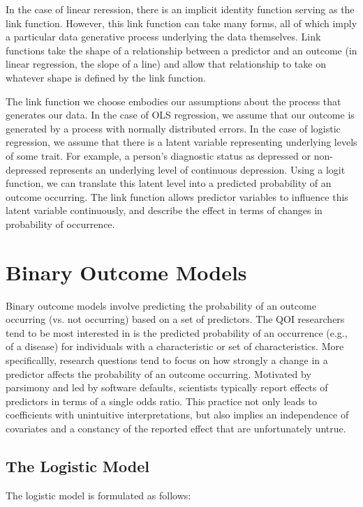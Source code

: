 \documentclass[jou, apacite]{apa6}
\begin{document}
In the case of linear reression, there is an implicit identity function serving as the link function.
However, this link function can take many forms, all of which imply a particular data generative process underlying the data themselves.
Link functions take the shape of a relationship between a predictor and an outcome (in linear regression, the slope of a line) and allow that relationship to take on whatever shape is defined by the link function.

The link function we choose embodies our assumptions about the process that generates our data.
In the case of OLS regression, we assume that our outcome is generated by a process with normally distributed errors.
In the case of logistic regression, we assume that there is a latent variable representing underlying levels of some trait. 
For example, a person's diagnostic status as depressed or non-depressed represents an underlying level of continuous depression. 
Using a logit function, we can translate this latent level into a predicted probability of an outcome occurring.
The link function allows predictor variables to influence this latent variable continuously, and describe the effect in terms of changes in probability of occurrence.
\section{Binary Outcome Models}

Binary outcome models involve predicting the probability of an outcome occurring (vs. not occurring) based on a set of predictors. 
The QOI researchers tend to be most interested in is the predicted probability of an occurrence (e.g., of a disease) for individuals with a characteristic or set of characteristics.
More specificallly, research questions tend to focus on how strongly a change in a predictor affects the probability of an outcome occurring.
Motivated by parsimony and led by software defaults, scientists typically report effects of predictors in terms of a single odds ratio.
This practice not only leads to coefficients with unintuitive interpretations, but also implies an independence of covariates and a constancy of the reported effect that are unfortunately untrue.

\subsection{The Logistic Model}

The logistic model is formulated as follows:
\end{document}
